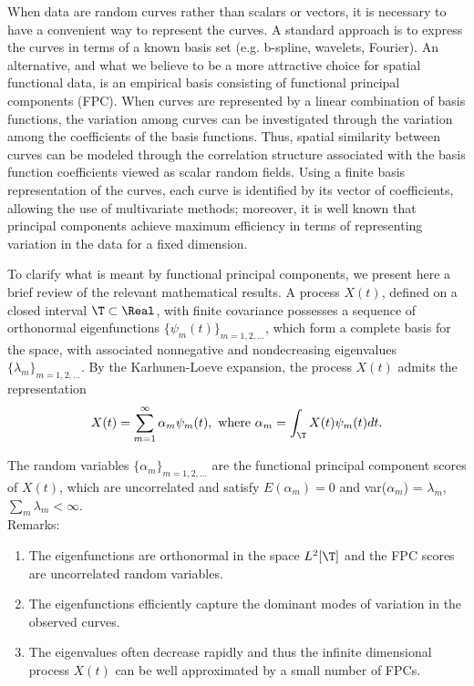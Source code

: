 When data are random curves rather than scalars or vectors, it is necessary to have a convenient way to represent the curves.  A standard approach is to express the curves in terms of a known basis set (e.g. b-spline, wavelets, Fourier). An alternative, and what we believe to be a more attractive choice for spatial functional data, is an empirical basis consisting of functional principal components (FPC). When curves are represented by a linear combination of basis functions, the variation among curves can be investigated through the variation among the coefficients of the basis functions. Thus, spatial similarity between curves can be modeled through the correlation structure associated with the basis function coefficients viewed as scalar random fields. Using a finite basis representation of the curves, each curve is identified by its vector of coefficients, allowing the use of multivariate methods; moreover, it is well known that principal components achieve maximum efficiency in terms of representing variation in the data for a fixed dimension. 

To clarify what is meant by functional principal components, we present here a brief review of the relevant mathematical results.
A process $X(t)$, defined on a closed interval $\T  \subset \Real$,  with finite covariance possesses a sequence of orthonormal eigenfunctions $\{\psi_m(t)\}_{m=1,2,\ldots}$, which form a complete basis for the space, with associated nonnegative and nondecreasing eigenvalues $\{\lambda_m \}_{m=1,2,\ldots}$. By the Karhunen-Loeve expansion, the process $X(t)$ admits the representation
\begin{equation*}
X(t) =  \sum_{m=1}^{\infty}\alpha_m \psi_m(t), \mbox{ where  } \alpha_m = \int_{\T} X(t) \psi_m(t)dt.
\end{equation*}

The random variables $\{\alpha_m \}_{m=1,2,\ldots}$ are the functional principal component scores of $X(t)$, which are uncorrelated and satisfy $E(\alpha_m)=0$ and var($\alpha_m$) = $\lambda_m$, $\sum_m \lambda_m < \infty$.\\
Remarks:
\begin{enumerate}
	\item The eigenfunctions are orthonormal in the space $L^2[\T]$ and the FPC scores are uncorrelated random variables.
	\item The eigenfunctions efficiently capture the dominant modes of variation in the observed curves.
	\item The eigenvalues often decrease rapidly and thus the infinite dimensional process $X(t)$ can be well approximated by a small number of FPCs.
\end{enumerate}

